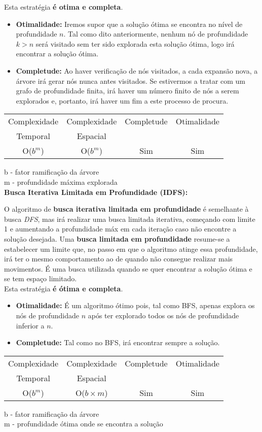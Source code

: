 \documentclass{article}
\begin{document}
Esta estratégia \textbf{é otima e completa}.
\begin{itemize}
\item{\textbf{Otimalidade:} Iremos supor que a solução ótima se encontra no nível de profundidade $n$. Tal como dito anteriormente, nenhum nó de profundidade $k>n$ será visitado sem ter sido explorada esta solução ótima, logo irá encontrar a solução ótima.}
\item{\textbf{Completude:} Ao haver verificação de nós visitados, a cada expansão nova, a árvore irá gerar nós nunca antes visitados. Se estivermos a tratar com um grafo de profundidade finita, irá haver um número finito de nós a serem explorados e, portanto, irá haver um fim a este processo de procura.}
\end{itemize}
\begin{center}
\begin{tabular}{|c|c|c|c|}
  \hline
  Complexidade & Complexidade & Completude & Otimalidade\\
  Temporal & Espacial & & \\
  \hline
  O($b^m$) & O($b^m$) & Sim & Sim \\
  \hline
\end{tabular}
\end{center}
b - fator ramificação da árvore\\
m - profundidade máxima explorada\\[5mm]
\textbf{Busca Iterativa Limitada em Profundidade (IDFS):}\par
O algoritmo de \textbf{busca iterativa limitada em profundidade} é semelhante à busca \textit{DFS}, mas irá realizar uma busca limitada iterativa, começando com limite 1 e aumentando a profundidade máx em cada iteração caso não encontre a solução desejada. Uma \textbf{busca limitada em profundidade} resume-se a estabelecer um limite que, no passo em que o algoritmo atinge essa profundidade, irá ter o mesmo comportamento ao de quando não consegue realizar mais movimentos. É uma busca utilizada quando se quer encontrar a solução ótima e se tem espaço limitado.\\
Esta estratégia \textbf{é ótima e completa}.
\begin{itemize}
\item{\textbf{Otimalidade:} É um algoritmo ótimo pois, tal como BFS, apenas explora os nós de profundidade $n$ após ter explorado todos os nós de profundidade inferior a $n$.}
\item{\textbf{Completude:} Tal como no BFS, irá encontrar sempre a solução.}
\end{itemize}
\begin{center}
\begin{tabular}{|c|c|c|c|}
  \hline
  Complexidade & Complexidade & Completude & Otimalidade\\
  Temporal & Espacial & & \\
  \hline
  O($b^m$) & O($b\times m$) & Sim & Sim \\
  \hline
\end{tabular}
\end{center}
b - fator ramificação da árvore\\
m - profundidade ótima onde se encontra a solução
\end{document}
